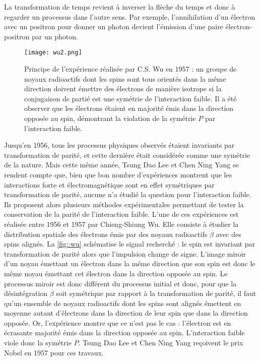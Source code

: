       La transformation de temps revient à inverser la flèche du temps et donc à regarder un processus dans l'autre sens. Par exemple, l'annihilation d'un électron avec un positron pour donner un photon devient l'émission d'une paire électron-positron par un photon.

      \begin{figure}[htpb]
        \centering
        \texttt{[image: wu2.png]}
        \caption[Principe de l'expérience réalisée par C.S. Wu en 1957]{\label{fig::wu}Principe de l'expérience réalisée par C.S. Wu en 1957 : un groupe de noyaux radioactifs dont les spins sont tous orientés dans la même direction doivent émettre des électrons de manière isotrope si la conjugaison de partié est une symétrie de l'interaction faible. Il a été observer que les électrons étaient en majorité émis dans la direction opposée au spin, démontrant la violation de la symétrie $P$ par l'interaction faible.}
      \end{figure}

      Jusqu'en 1956, tous les processus physiques observés étaient invariants par transformation de parité, et cette dernière était considérée comme une symétrie de la nature. Mais cette même année, Tsung Dao Lee et Chen Ning Yang\cite{Lee1956} se rendent compte que, bien que bon nombre d'expériences montrent que les interactions forte et électromagnétique sont en effet symétriques par transformation de parité, aucune n'a étudié la question pour l'interaction faible. Ils proposent alors plusieurs méthodes expérimentales permettant de tester la conservation de la parité de l'interaction faible. L'une de ces expériences est réalisée entre 1956 et 1957 par Chieng-Shiung Wu. Elle consiste à étudier la distribution spatiale des électrons émis par des noyaux radioactifs $\beta$ avec des spins alignés. La \autoref{fig::wu} schématise le signal recherché : le spin est invariant par transformation de parité alors que l'impulsion change de signe. L'image miroir d'un noyau émettant un électron dans la même direction que son spin est donc le même noyau émettant cet électron dans la direction opposée au spin. Le processus miroir est donc différent du processus initial et donc, pour que la désintégration $\beta$ soit symétrique par rapport à la transformation de parité, il faut qu'un ensemble de noyaux radioactifs dont les spins sont alignés émettent en moyenne autant d'électrons dans la direction de leur spin que dans la direction opposée. Or, l'expérience montre que ce n'est pas le cas : l'électron est en écrasante majorité émis dans la direction opposée au spin\cite{Wu1957}. L'interaction faible viole donc la symétrie $P$. Tsung Dao Lee et Chen Ning Yang reçoivent le prix Nobel en 1957 pour ces travaux.


